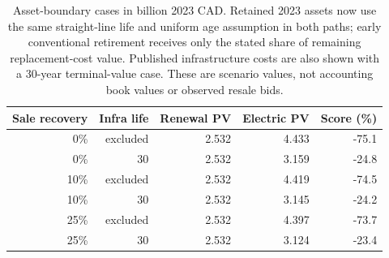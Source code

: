 \begin{table}[htbp]
\centering
\begin{tabular}{@{}rrrrr@{}}
\toprule
Sale recovery & Infra life & Renewal PV & Electric PV & Score (\%)\\
\midrule
0\% & excluded & 2.532 & 4.433 & -75.1\\
0\% & 30 & 2.532 & 3.159 & -24.8\\
10\% & excluded & 2.532 & 4.419 & -74.5\\
10\% & 30 & 2.532 & 3.145 & -24.2\\
25\% & excluded & 2.532 & 4.397 & -73.7\\
25\% & 30 & 2.532 & 3.124 & -23.4\\
\bottomrule
\end{tabular}
\caption{Asset-boundary cases in billion 2023 CAD. Retained 2023 assets now use the same straight-line life and uniform age assumption in both paths; early conventional retirement receives only the stated share of remaining replacement-cost value. Published infrastructure costs are also shown with a 30-year terminal-value case. These are scenario values, not accounting book values or observed resale bids.}
\end{table}
